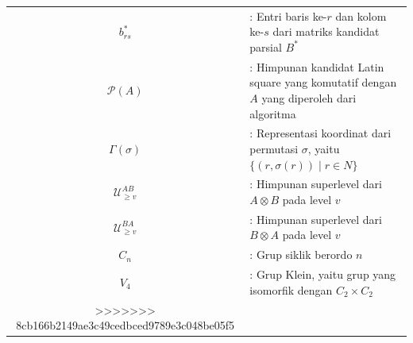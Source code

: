 \begin{longtable}{c p{14cm}}
  $b^*_{rs}$                 & : Entri baris ke-$r$ dan kolom ke-$s$ dari matriks kandidat parsial $B^*$                \\
  $\mathcal{P}(A)$           & : Himpunan kandidat Latin square yang komutatif dengan $A$ yang diperoleh dari algoritma \\
  $\Gamma(\sigma)$           & : Representasi koordinat dari permutasi $\sigma$, yaitu $\{(r,\sigma(r))\mid r\in N\}$   \\
  $\mathcal{U}_{\ge v}^{AB}$ & : Himpunan superlevel dari $A\otimes B$ pada level $v$                                   \\
  $\mathcal{U}_{\ge v}^{BA}$ & : Himpunan superlevel dari $B\otimes A$ pada level $v$                                   \\
  $C_n$                      & : Grup siklik berordo $n$                                                                \\
  $V_4$                      & : Grup Klein, yaitu grup yang isomorfik dengan $C_2\times C_2$                           \\
>>>>>>> 8cb166b2149ae3c49cedbced9789e3c048be05f5
\end{longtable}